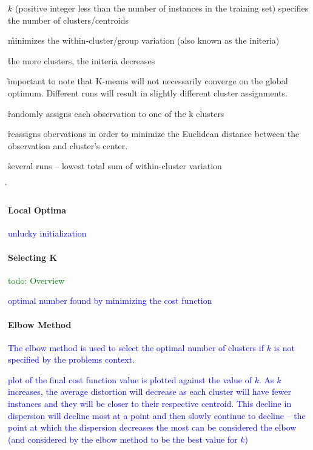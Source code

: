 \r{$k$ (positive integer less than the number of instances in the training set) specifies the number of clusters/centroids}

\r{minimizes the within-cluster/group variation (also known as the initeria)}

\r{the more clusters, the initeria decreases}


\r{important to note that K-means will not necessarily converge on the global optimum. Different runs will result in slightly different cluster assignments.}

\r{randomly assigns each observation to one of the k clusters}

\r{reassigns obervations in order to minimize the Euclidean distance between the observation and cluster's center.}

\r{several runs -- lowest total sum of within-cluster variation}


\r{}

\paragraph{Local Optima}

\textcolor{blue}{unlucky initialization}

\paragraph{Selecting K}

\textcolor{green}{todo: Overview}

\textcolor{blue}{optimal number found by minimizing the cost function}

\paragraph{Elbow Method}

\textcolor{blue}{The elbow method is used to select the optimal number of clusters if $k$ is not specified by the problems context.}

\textcolor{blue}{plot of the final cost function value is plotted against the value of $k$. As $k$ increases, the average distortion will decrease as each cluster will have fewer instances and they will be closer to their respective centroid. This decline in dispersion will decline most at a point and then slowly continue to decline -- the point at which the dispersion decreases the most can be considered the elbow (and considered by the elbow method to be the best value for $k$)}

